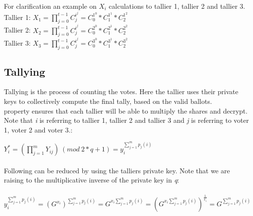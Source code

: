  For clarification an example on \begin{math}X_i\end{math} calculations to tallier 1, tallier 2 and tallier 3.\\
Tallier 1: \begin{math}X_1=\prod\limits_{j=0}^{t-1} C_j^{i^j} = C_0^{1^0} * C_1^{1^1} * C_2^{1^2}\end{math}\\
Tallier 2: \begin{math}X_2=\prod\limits_{j=0}^{t-1} C_j^{i^j} = C_0^{2^0} * C_1^{2^1} * C_2^{2^2}\end{math}\\
Tallier 3: \begin{math}X_3=\prod\limits_{j=0}^{t-1} C_j^{i^j} = C_0^{3^0} * C_1^{3^1} * C_2^{3^2}\end{math}



\subsection{Tallying}
Tallying is the process of counting the votes. Here the tallier uses their private keys to collectively compute the final tally, based on the valid ballots.\\


\noindent
{} property ensures that each tallier will  be able to multiply the shares and decrypt. Note that \textit{i} is referring to tallier 1, tallier  2 and tallier 3 and \textit{j} is referring to voter 1, voter 2 and voter 3.:\\

\begin{infobox}
\begin{math}Y_i^*=(\prod\limits_{j=1}^{m} Y_{ij}) \ (mod\ 2*q+1) =y_i^{\sum\limits_{j=1}^m p_j(i)}\end{math}\\ \\
Following can be reduced by using the talliers private key. Note that we are raising to the multiplicative inverse of the private key in  \textit{q}:\\\\
\begin{math}y_i^{\sum\limits_{j=1}^m p_j(i)}=(G^{x_i})^{\sum\limits_{j=1}^m p_j(i)} = G^{x_i \sum\limits_{j=1}^m p_j(i)}= (G^{x_i \sum\limits_{j=1}^m p_j(i)})^{\frac{1}{x_i}}= G^{ \sum\limits_{j=1}^m p_j(i)}   \end{math}
\end{infobox}


